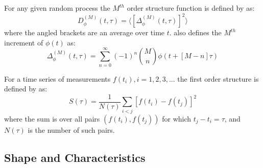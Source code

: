 \documentclass[12pt, oneside]{smuthesis}
\begin{document}
For any given random process the $M^{th}$ order structure function is defined by \cite{rutman} as:
\begin{equation} \label{eqn3.1}
D^{\left(M\right)}_{\phi}\left(t, \tau\right) = \langle\left[\Delta^{\left(M\right)}_{\phi}\left(t, \tau\right)\right]^{2}\rangle
\end{equation}
where the angled brackets are an average over time $t$. \cite{rutman} also defines the $M^{th}$ increment of $\phi\left(t\right)$ as:
\begin{equation} \label{eqn3.2}
\Delta^{\left(M\right)}_{\phi}\left(t, \tau\right) = \sum_{n=0}^{\infty}\left(-1\right)^{n}{M \choose n}\phi\left(t + \left[M - n\right]\tau\right)
\end{equation}

For a time series of measurements $f\left(t_{i}\right), i = 1,2,3,...$ the first order structure is defined by \citep{collier2001} as:
\begin{equation}
S\left(\tau\right) = \frac{1}{N\left(\tau\right)}\sum_{i<j}\left[f\left(t_{i}\right)-f\left(t_{j}\right)\right]^{2}
\end{equation}
where the sum is over all pairs $\left(f\left(t_{i}\right),f\left(t_{j}\right)\right)$ for which $t_{j}-t_{i}=\tau$, and $N\left(\tau\right)$ is the number of such pairs.

\subsection{\sc Shape and Characteristics} \label{shapeAndCharacteristics}
\end{document}
